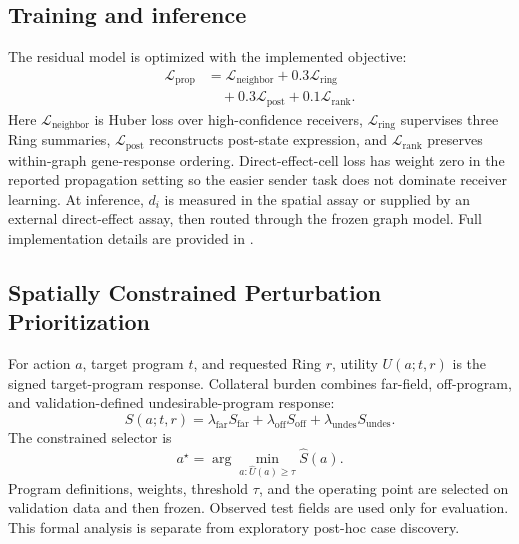 \documentclass[sigconf,review,balance=false]{acmart}
\begin{document}
\subsection{Training and inference}
\label{sec:training_inference}

The residual model is optimized with the implemented objective:
\begin{equation}
\label{eq:training_objectives}
\begin{aligned}
\mathcal{L}_{\mathrm{prop}}
&= \mathcal{L}_{\mathrm{neighbor}}
 + 0.3\mathcal{L}_{\mathrm{ring}}\\
&\quad
 + 0.3\mathcal{L}_{\mathrm{post}}
 + 0.1\mathcal{L}_{\mathrm{rank}} .
\end{aligned}
\end{equation}
Here $\mathcal{L}_{\mathrm{neighbor}}$ is Huber loss over high-confidence
receivers, $\mathcal{L}_{\mathrm{ring}}$ supervises three Ring summaries,
$\mathcal{L}_{\mathrm{post}}$ reconstructs post-state expression, and
$\mathcal{L}_{\mathrm{rank}}$ preserves within-graph gene-response ordering.
Direct-effect-cell loss has weight zero in the reported propagation setting so
the easier sender task does not dominate receiver learning. At inference,
$d_i$ is measured in the spatial assay or supplied by an external
direct-effect assay, then routed through the frozen graph model. Full
implementation details are provided in .

\subsection{Spatially Constrained Perturbation Prioritization}
\label{sec:intervention_method}
For action $a$, target program $t$, and requested Ring $r$, utility
$U(a;t,r)$ is the signed target-program response. Collateral burden combines
far-field, off-program, and validation-defined undesirable-program response:
\begin{equation}
S(a;t,r)=\lambda_{\mathrm{far}}S_{\mathrm{far}}
+\lambda_{\mathrm{off}}S_{\mathrm{off}}
+\lambda_{\mathrm{undes}}S_{\mathrm{undes}}.
\label{eq:burden}
\end{equation}
The constrained selector is
\begin{equation}
a^\star=\arg\min_{a:\widehat U(a)\geq\tau}\widehat S(a).
\label{eq:selector}
\end{equation}
Program definitions, weights, threshold $\tau$, and the operating point are
selected on validation data and then frozen. Observed test fields are used only
for evaluation. This formal analysis is separate from exploratory post-hoc
case discovery.
\end{document}
